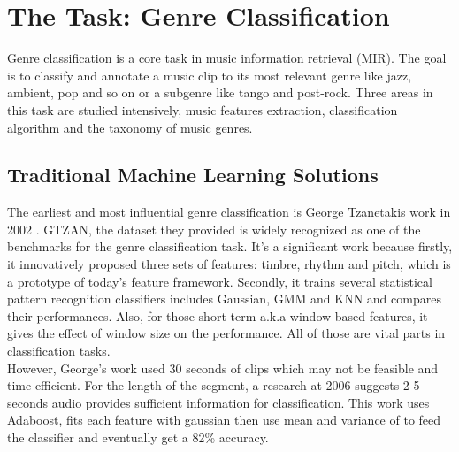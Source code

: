 \documentclass[a4paper, 11pt]{report}
\begin{document}
\section{The Task: Genre Classification} 
Genre classification is a core task in music information retrieval (MIR). The goal is to classify and annotate a music clip to its most relevant genre like jazz, ambient, pop and so on or a subgenre like tango and post-rock. Three areas in this task are studied intensively, music features extraction, classification algorithm and the taxonomy of music genres.
\subsection{Traditional Machine Learning Solutions}
The earliest and most influential genre classification is George Tzanetakis work in 2002 \cite{tzanetakis2002musical}. GTZAN, the dataset they provided is widely recognized as one of the benchmarks for the genre classification task. It's a significant work because firstly, it innovatively proposed three sets of features: timbre, rhythm and pitch, which is a prototype of today's feature framework. Secondly, it trains several statistical pattern recognition classifiers includes Gaussian, GMM and KNN and compares their performances. Also, for those short-term a.k.a window-based features, it gives the effect of window size on the performance. All of those are vital parts in classification tasks.\\
 However, George's work used 30 seconds of clips which may not be feasible and time-efficient. For the length of the segment, a research at 2006 suggests 2-5 seconds audio provides sufficient information for classification\cite{bergstra2006aggregate}. This work uses Adaboost, fits each feature with gaussian then use mean and variance of to feed the classifier and eventually get a 82\% accuracy.
\end{document}
